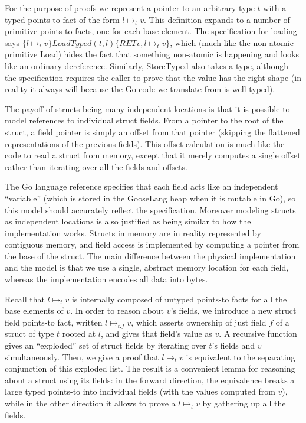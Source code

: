 For the purpose of proofs we represent a pointer to an arbitrary type
\(t\) with a typed points-to fact of the form \(l \mapsto_t v\). This
definition expands to a number of primitive points-to facts, one for
each base element. The specification for loading says
\(\{l \mapsto_t v\} LoadTyped(t, l) \{RET v, l \mapsto_t v\}\), which
(much like the non-atomic primitive Load) hides the fact that something
non-atomic is happening and looks like an ordinary dereference.
Similarly, StoreTyped also takes a type, although the specification
requires the caller to prove that the value has the right shape (in
reality it always will because the Go code we translate from is
well-typed).

The payoff of structs being many independent locations is that it is
possible to model references to individual struct fields. From a pointer
to the root of the struct, a field pointer is simply an offset from that
pointer (skipping the flattened representations of the previous fields).
This offset calculation is much like the code to read a struct from
memory, except that it merely computes a single offset rather than
iterating over all the fields and offsets.

The Go language reference specifies that each field acts like an
independent ``variable'' (which is stored in the GooseLang heap when it
is mutable in Go), so this model should accurately reflect the
specification. Moreover modeling structs as independent locations is
also justified as being similar to how the implementation works. Structs
in memory are in reality represented by contiguous memory, and field
access is implemented by computing a pointer from the base of the
struct. The main difference between the physical implementation and the
model is that we use a single, abstract memory location for each field,
whereas the implementation encodes all data into bytes.

Recall that \(l \mapsto_t v\) is internally composed of untyped
points-to facts for all the base elements of \(v\). In order to reason
about \(v\)'s fields, we introduce a new struct field points-to fact,
written \(l \mapsto_{t.f} v\), which asserts ownership of just field
\(f\) of a struct of type \(t\) rooted at \(l\), and gives that field's
value as \(v\). A recursive function gives an ``exploded'' set of struct
fields by iterating over \(t\)'s fields and \(v\) simultaneously. Then,
we give a proof that \(l \mapsto_t v\) is equivalent to the separating
conjunction of this exploded list. The result is a convenient lemma for
reasoning about a struct using its fields: in the forward direction, the
equivalence breaks a large typed points-to into individual fields (with
the values computed from \(v\)), while in the other direction it allows
to prove a \(l \mapsto_t v\) by gathering up all the fields.


